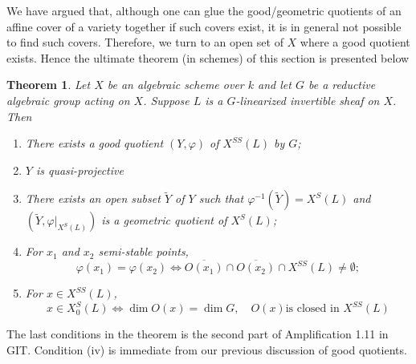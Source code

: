 \documentclass[12pt]{report}
\newtheorem{theorem}{Theorem}[section]
\theoremstyle{remark}
\theoremstyle{definition}
\begin{document}
    We have argued that, although one can glue the good/geometric quotients of an affine cover of a variety together if such covers exist, it is in general not possible to find such covers. Therefore, we turn to an open set of $X$ where a good quotient exists. Hence the ultimate theorem (in schemes) of this section is presented below
    \begin{theorem}
        Let $X$ be an algebraic scheme over $k$ and let $G$ be a reductive algebraic group acting on $X$. Suppose $L$ is a $G$-linearized invertible sheaf on $X$. Then
        \begin{enumerate}[\normalfont(i)]
            \item There exists a good quotient $(Y,\varphi)$ of $X^{SS}(L)$ by $G$;
            \item $Y$ is quasi-projective
            \item There exists an open subset $\tilde{Y}$ of $Y$ such that $\varphi^{-1}(\tilde Y)=X^S(L)$ and $(\tilde Y, \varphi|_{X^S(L)})$ is a geometric quotient of $X^S(L)$;
            \item For $x_1$ and $x_2$ semi-stable points,
                \[\varphi(x_1)=\varphi(x_2)\iff\overline{O(x_1)}\cap\overline{O(x_2)}\cap X^{SS}(L)\neq\emptyset;\]
            \item For $x\in X^{SS}(L)$,
                \[x\in X^S_0(L)\iff\dim O(x)=\dim G,\quad O(x)\text{is closed in }X^{SS}(L)\] 
        \end{enumerate}
    \end{theorem}
    The last conditions in the theorem is the second part of Amplification 1.11 in GIT. Condition (iv) is immediate from our previous discussion of good quotients.
\end{document}
